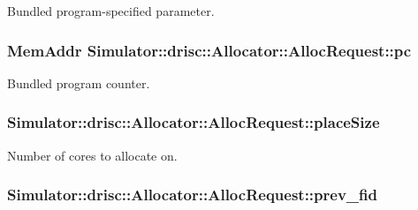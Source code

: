 Bundled program-\/specified parameter. 

\hypertarget{struct_simulator_1_1drisc_1_1_allocator_1_1_alloc_request_ac3d1fd55490ac20bf2d0a6ee06883952}{
\subsubsection[{pc}]{\setlength{\rightskip}{0pt plus 5cm}Mem\+Addr Simulator\+::drisc\+::\+Allocator\+::\+Alloc\+Request\+::pc}}\label{struct_simulator_1_1drisc_1_1_allocator_1_1_alloc_request_ac3d1fd55490ac20bf2d0a6ee06883952}


Bundled program counter. 

\hypertarget{struct_simulator_1_1drisc_1_1_allocator_1_1_alloc_request_a1f6cc515ec7348788603310ab32ff47b}{
\subsubsection[{place\+Size}]{ Simulator\+::drisc\+::\+Allocator\+::\+Alloc\+Request\+::place\+Size}}\label{struct_simulator_1_1drisc_1_1_allocator_1_1_alloc_request_a1f6cc515ec7348788603310ab32ff47b}


Number of cores to allocate on. 

\hypertarget{struct_simulator_1_1drisc_1_1_allocator_1_1_alloc_request_a5a56c365cbf29936ac19b7c188856eab}{
\subsubsection[{prev\+\_\+fid}]{ Simulator\+::drisc\+::\+Allocator\+::\+Alloc\+Request\+::prev\+\_\+fid}}\label{struct_simulator_1_1drisc_1_1_allocator_1_1_alloc_request_a5a56c365cbf29936ac19b7c188856eab}


